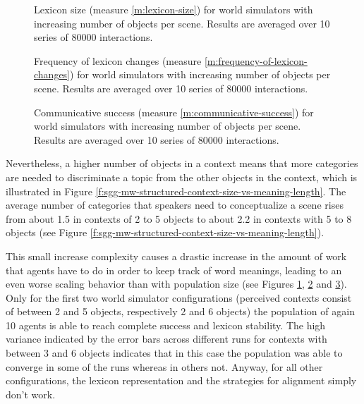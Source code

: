 \startfiguregroup

\begin{figure}[p]
  \caption{Lexicon size (measure \ref{m:lexicon-size}) for world
    simulators with increasing number of objects per scene. Results
    are averaged over 10 series of 80000 interactions. }
  \label{f:sgg-mw-structured-best-best-context-size-vs-lexicon-size}
\end{figure}


\begin{figure}[p]
  \caption{Frequency of lexicon changes (measure
    \ref{m:frequency-of-lexicon-changes}) for world simulators with
    increasing number of objects per scene. Results are averaged over
    10 series of 80000 interactions. }
  \label{f:sgg-mw-structured-best-best-context-size-vs-lexicon-changes}
\end{figure}

\begin{figure}[p]
  \caption{Communi\-cative success (measure
    \ref{m:communicative-success}) for world simulators with
    increasing number of objects per scene. Results are averaged over
    10 series of 80000 interactions. }
  \label{f:sgg-mw-structured-best-best-context-size-vs-communicative-success}
\end{figure}

\stopfiguregroup


Nevertheless, a higher number of objects in a context means that more
categories are needed to discriminate a topic from the other objects
in the context, which is illustrated in Figure
\ref{f:sgg-mw-structured-context-size-vs-meaning-length}. The average
number of categories that speakers need to conceptualize a scene rises
from about 1.5 in contexts of 2 to 5 objects to about 2.2 in contexts
with 5 to 8 objects (see Figure
\ref{f:sgg-mw-structured-context-size-vs-meaning-length}).

This small increase complexity causes a drastic increase in the amount
of work that agents have to do in order to keep track of word
meanings, leading to an even worse scaling behavior than with
population size (see Figures
\ref{f:sgg-mw-structured-best-best-context-size-vs-lexicon-size},
\ref{f:sgg-mw-structured-best-best-context-size-vs-lexicon-changes}
and
\ref{f:sgg-mw-structured-best-best-context-size-vs-communicative-success}). Only
for the first two world simulator configurations (perceived contexts
consist of between 2 and 5 objects, respectively 2 and 6 objects) the
population of again 10 agents is able to reach complete success and
lexicon stability. The high variance indicated by the error bars
across different runs for contexts with between 3 and 6 objects
indicates that in this case the population was able to converge in
some of the runs whereas in others not. Anyway, for all other
configurations, the lexicon representation and the strategies for
alignment simply don't work.



